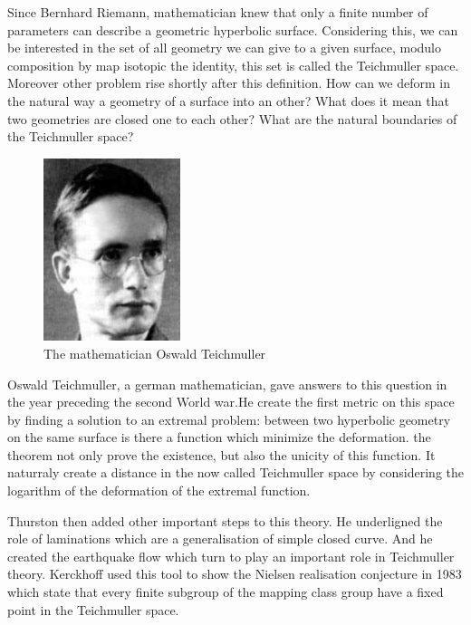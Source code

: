 
\hspace{20 px} Since Bernhard Riemann, mathematician knew that only a finite number of parameters can describe a geometric hyperbolic surface. Considering this, we can be interested in the set of all geometry we can give to a given surface, modulo composition by map isotopic the identity, this set is called the Teichmuller space. Moreover other problem rise shortly after this definition. How can we deform in the natural way a geometry of a surface into an other? What does it mean that two geometries are closed one to each other? What are the natural boundaries of the Teichmuller space?

\begin{figure}[!ht]
  \centering
  \includegraphics[width=4cm]{Image/Teichmuller.jpeg}
  \caption{The mathematician Oswald Teichmuller}
\end{figure}

\vspace{10 px}

Oswald Teichmuller, a german mathematician, gave answers to this question in the year preceding the second World war.He create the first metric on this space by finding a solution to an extremal problem: between two hyperbolic geometry on the same surface is there a function which minimize the deformation. the theorem not only prove the existence, but also the unicity of this function. It naturraly create a distance in the now called Teichmuller space by considering the logarithm of the deformation of the extremal function.

\vspace{10 px}

Thurston then added other important steps to this theory. He underligned the role of laminations which are a generalisation of simple closed curve. And he created the earthquake flow which turn to play an important role in Teichmuller theory.
Kerckhoff used this tool to show the Nielsen realisation conjecture in 1983 \cite{NielsenRealizationPro} which state that every finite subgroup of the mapping class group have a fixed point in the Teichmuller space.

